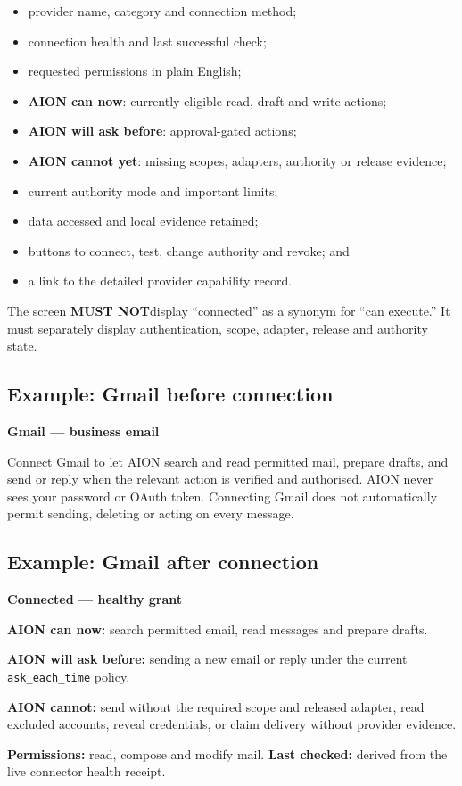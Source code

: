 \documentclass[11pt,a4paper]{article}
\newcommand{\code}[1]{\texttt{#1}}
\newcommand{\mustnot}{\textbf{MUST NOT}}
\begin{document}
\begin{itemize}
  \item provider name, category and connection method;
  \item connection health and last successful check;
  \item requested permissions in plain English;
  \item \textbf{AION can now}: currently eligible read, draft and write actions;
  \item \textbf{AION will ask before}: approval-gated actions;
  \item \textbf{AION cannot yet}: missing scopes, adapters, authority or release evidence;
  \item current authority mode and important limits;
  \item data accessed and local evidence retained;
  \item buttons to connect, test, change authority and revoke; and
  \item a link to the detailed provider capability record.
\end{itemize}

The screen \mustnot display ``connected'' as a synonym for ``can execute.'' It
must separately display authentication, scope, adapter, release and authority
state.

\subsection{Example: Gmail before connection}

\begin{tcolorbox}[colback=AionLightBlue,colframe=AionBlue!45]
\textbf{Gmail --- business email}\par
Connect Gmail to let AION search and read permitted mail, prepare drafts, and
send or reply when the relevant action is verified and authorised. AION never
sees your password or OAuth token. Connecting Gmail does not automatically
permit sending, deleting or acting on every message.
\end{tcolorbox}

\subsection{Example: Gmail after connection}

\begin{tcolorbox}[colback=AionLightBlue,colframe=AionBlue!45]
\textbf{Connected --- healthy grant}\par
\textbf{AION can now:} search permitted email, read messages and prepare drafts.\par
\textbf{AION will ask before:} sending a new email or reply under the current
\code{ask\_each\_time} policy.\par
\textbf{AION cannot:} send without the required scope and released adapter,
read excluded accounts, reveal credentials, or claim delivery without provider
evidence.\par
\textbf{Permissions:} read, compose and modify mail. \textbf{Last checked:}
derived from the live connector health receipt.
\end{tcolorbox}
\end{document}

